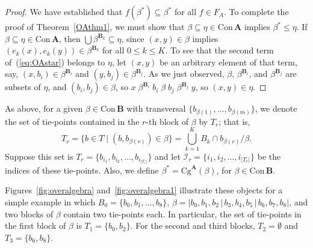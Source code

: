 \documentclass[cm,dissertation]{uhthesis}
\theoremstyle{plain}
\theoremstyle{definition}
\theoremstyle{remark}
\numberwithin{theorem}{section}
\numberwithin{claim}{chapter}
\numberwithin{equation}{section}
\numberwithin{conjecture}{chapter}
\newcommand{\<}{\ensuremath{\langle}}
\renewcommand{\>}{\ensuremath{\rangle}}
\renewcommand{\leq}{\ensuremath{\leqslant}}
\newcommand{\Cg}{\ensuremath{\mathrm{Cg}}}
\newcommand{\Con}{\ensuremath{\mathrm{Con\,}}}
\newcommand{\0}{\ensuremath{\mathbf{0}}}
\newcommand{\1}{\ensuremath{\mathbf{1}}}
\newcommand{\2}{\ensuremath{\mathbf{2}}}
\newcommand{\3}{\ensuremath{\mathbf{3}}}
\newcommand{\4}{\ensuremath{\mathbf{4}}}
\newcommand{\5}{\ensuremath{\mathbf{5}}}
\newcommand{\bA}{\ensuremath{\mathbf{A}}}
\newcommand{\bB}{\ensuremath{\mathbf{B}}}
\newcommand{\sI}{\ensuremath{\mathscr{I}}}
\begin{document}
\begin{proof}
  We have established that $f(\beta^*)\subseteq \beta^*$ for all $f\in F_A$.  To
  complete the proof of Theorem~\ref{OAthm1}, we must show that
  $\beta \subseteq \eta \in \Con \bA$ implies
  $\beta^*\leq \eta$.
  If $\beta \subseteq \eta\in \Con \bA$, then $\bigcup \beta^{\bB_k} \subseteq
  \eta$, since $(x,y)\in \beta$ implies $(e_k(x), e_k(y))\in \beta^{\bB_k}$ for all
  $0\leq k\leq K$.  To see that the second term of~(\ref{eq:OAstar}) belongs to
  $\eta$, let $(x,y)$ be an arbitrary element of that term, say, $(x, b_i) \in
  \beta^{\bB_i}$ and $(y, b_j)\in \beta^{\bB_j}$.  As we just observed, $\beta,\,
  \beta^{\bB_i}$, and $\beta^{\bB_j}$ are subsets of $\eta$, and $(b_i, b_j) \in
  \beta$, so $x \; \beta^{\bB_i}\; b_i \; \beta \; b_j \;\beta^{\bB_j} \; y$, so 
  $(x,y)\in \eta$.

\end{proof}

As above, for a given $\beta \in \Con \bB$ with transversal
$\{b_{\beta(1)}, \dots, b_{\beta(m)}\}$, we denote
the set of tie-points contained in the $r$-th block of $\beta$ by $T_r$; that is,
\[
T_r = \{b\in T \mid (b, b_{\beta(r)}) \in \beta\}
=  \bigcup_{k=1}^K B_k \cap b_{\beta(r)}/\beta.
\]
Suppose this set %
is $T_r = \{b_{i_1}, b_{i_2}, \dots, b_{i_{|T_r|}}\}$ and let 
$\sI_r = \{i_1, i_2, \dots, i_{|T_r|}\}$ be the indices of these tie-points.   
Also, we define $\beta^*=\Cg^\bA(\beta)$, for $\beta\in\Con \bB$.

Figures~\ref{fig:overalgebra} and~\ref{fig:overalgebra1} illustrate these
objects for a simple example in which $B_0 = \{b_0, b_1, \dots, b_8\}$, $\beta =
|b_0, b_1, b_2 \,|\,b_3, b_4, b_5\,|\,b_6, b_7, b_8|$, and two blocks of $\beta$ contain
two tie-points each.  In particular,  the set of tie-points in the first block
of $\beta$ is $T_1 = \{b_0, b_2\}$. For the second and third blocks,
$T_2 = \emptyset$ and $T_3 = \{b_6, b_8\}$.
\end{document}
